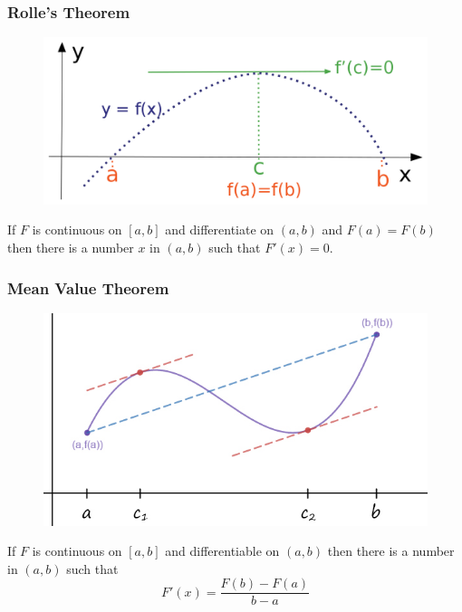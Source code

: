 \documentclass{beamer}
\begin{document}
\begin{frame}
\frametitle{\textbf{Rolle's Theorem}}
\begin{figure}
	\centering
	\includegraphics[height=.4\textheight]{rolles.png}\\
	\hspace*{10pt}\hbox{}
\end{figure}

\begin{theorem}
	If $F$ is continuous on $[a,b]$ and differentiate on $(a,b)$ and $F(a)=F(b)$ then there is a number $x$ in $(a,b)$ such that $F'(x)=0$.
\end{theorem}
\end{frame}

\begin{frame}
\frametitle{\textbf{Mean Value Theorem}}
\begin{figure}
	\centering
	\includegraphics[height=.35\textheight]{meanvalue.jpg}\\
	\hspace*{10pt}\hbox{}
\end{figure}
\begin{theorem}
	If $F$ is continuous on $[a,b]$ and differentiable on $(a,b)$ then there is a number in $(a,b)$ such that
	$$F'(x) = \frac{F(b)-F(a)}{b-a}$$
\end{theorem}
\end{frame}
\end{document}
